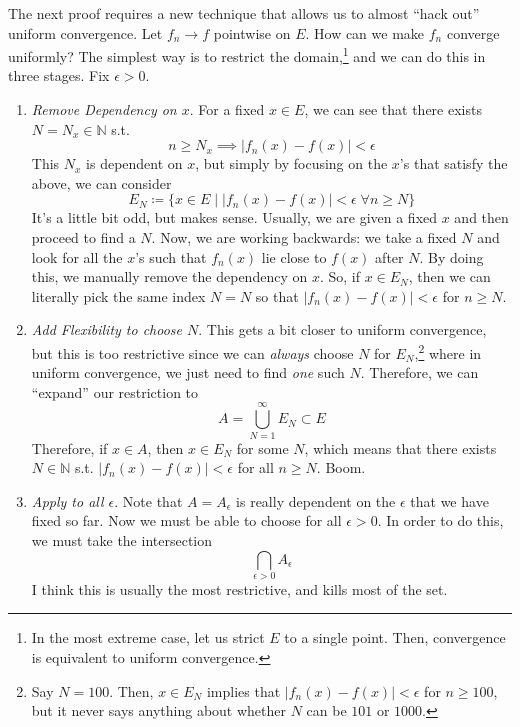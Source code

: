   The next proof requires a new technique that allows us to almost ``hack out'' uniform convergence. Let $f_n \to f$ pointwise on $E$. How can we make $f_n$ converge uniformly? The simplest way is to restrict the domain,\footnote{In the most extreme case, let us strict $E$ to a single point. Then, convergence is equivalent to uniform convergence.} and we can do this in three stages. Fix $\epsilon > 0$. 
  \begin{enumerate}
    \item \textit{Remove Dependency on $x$}. 
    For a fixed $x \in E$, we can see that there exists $N = N_x \in \mathbb{N}$ s.t. 
    \begin{equation}
      n \geq N_x \implies |f_n (x) - f(x)| < \epsilon
    \end{equation}
    This $N_x$ is dependent on $x$, but simply by focusing on the $x$'s that satisfy the above, we can consider 
    \begin{equation}
      E_N \coloneqq \{x \in E \mid |f_n (x) - f(x)| < \epsilon \; \forall n \geq N \}
    \end{equation}
    It's a little bit odd, but makes sense. Usually, we are given a fixed $x$ and then proceed to find a $N$. Now, we are working backwards: we take a fixed $N$ and look for all the $x$'s such that $f_n(x)$ lie close to $f(x)$ after $N$. By doing this, we manually remove the dependency on $x$. So, if $x \in E_N$, then we can literally pick the same index $N = N$ so that $|f_n (x) - f(x)| < \epsilon$ for $n \geq N$. 

    \item \textit{Add Flexibility to choose $N$}. This gets a bit closer to uniform convergence, but this is too restrictive since we can \textit{always} choose $N$ for $E_N$,\footnote{Say $N = 100$. Then, $x \in E_N$ implies that $|f_n (x) - f(x)| < \epsilon$ for $n \geq 100$, but it never says anything about whether $N$ can be $101$ or $1000$.} where in uniform convergence, we just need to find \textit{one} such $N$. Therefore, we can ``expand'' our restriction to 
    \begin{equation}
      A = \bigcup_{N = 1}^\infty E_N  \subset E
    \end{equation}
    Therefore, if $x \in A$, then $x \in E_N$ for some $N$, which means that there exists $N \in \mathbb{N}$ s.t. $|f_n (x) - f(x)| < \epsilon$ for all $n \geq N$. Boom. 

    \item \textit{Apply to all $\epsilon$}. Note that $A = A_\epsilon$ is really dependent on the $\epsilon$ that we have fixed so far. Now we must be able to choose for all $\epsilon > 0$. In order to do this, we must take the intersection 
    \begin{equation}
      \bigcap_{\epsilon > 0} A_\epsilon
    \end{equation}
    I think this is usually the most restrictive, and kills most of the set. 
  \end{enumerate}

